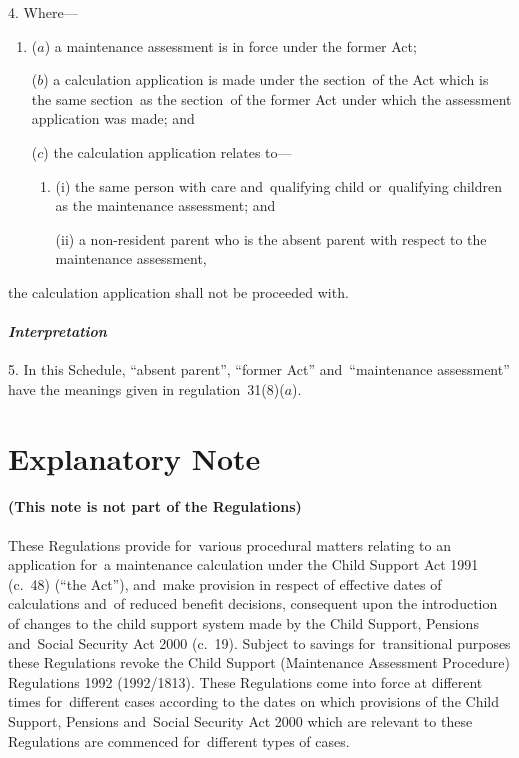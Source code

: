 \documentclass[12pt,a4paper]{article}
\begin{document}
4.  Where—
\begin{enumerate}\item[]
($a$) a maintenance assessment is in force under the former Act;

($b$) a calculation application is made 
under the section~of the Act which is the same section~as the section~of the former Act under which the assessment application was made; and

($c$) the calculation application relates to—
\begin{enumerate}\item[]
(i) the same person with care and~qualifying child or~qualifying children as the maintenance assessment; and

(ii) a non-resident parent who is the absent parent with respect to the maintenance assessment,
\end{enumerate}
\end{enumerate}
the calculation application shall not be proceeded with.


\subsection*{\itshape Interpretation}

5.  In this Schedule, “absent parent”, “former Act” and~“maintenance assessment” have the meanings given in regulation~31(8)($a$).

\part{Explanatory Note}

\renewcommand\parthead{— Explanatory Note}

\subsection*{(This note is not part of the Regulations)}

These Regulations provide for~various procedural matters relating to an application for~a maintenance calculation under the Child Support Act 1991 (c.\ 48) (“the Act”), and~make provision in respect of effective dates of calculations and~of reduced benefit decisions, consequent upon the introduction of changes to the child support system made by the Child Support, Pensions and~Social Security Act 2000 (c.~19). Subject to savings for~transitional purposes these Regulations revoke the Child Support (Maintenance Assessment Procedure) Regulations 1992 (1992/1813). These Regulations come into force at different times for~different cases according to the dates on which provisions of the Child Support, Pensions and~Social Security Act 2000 which are relevant to these Regulations are commenced for~different types of cases.
\end{document}
